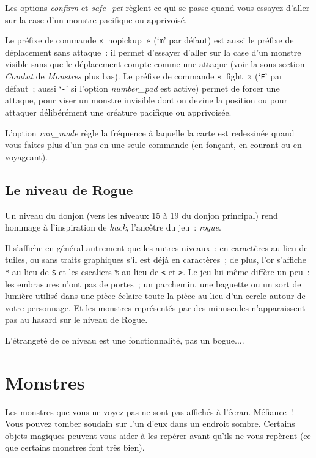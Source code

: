 \documentclass[titlepage]{article}
\begin{document}
Les options
\textit{confirm}
et
\textit{safe\_pet}
règlent ce qui se passe quand vous essayez d'aller sur la case d'un
monstre pacifique ou apprivoisé.


Le préfixe de commande «~nopickup~» (`\texttt{m}' par défaut)
est aussi le préfixe de déplacement sans attaque~: il permet d'essayer
d'aller sur la case d'un monstre visible sans que le déplacement compte
comme une attaque (voir la sous-section \textit{Combat} de \textit{Monstres} plus
bas).
Le préfixe de commande «~fight~» (`\texttt{F}' par défaut~;
aussi `\texttt{-}' si l'option
\textit{number\_pad}
est active) permet de forcer une attaque, pour viser un monstre invisible
dont on devine la position ou pour attaquer délibérément une créature
pacifique ou apprivoisée.


L'option
\textit{run\_mode}
règle la fréquence à laquelle la carte est redessinée quand vous faites
plus d'un pas en une seule commande (en fonçant, en courant ou en
voyageant).

\subsection{Le niveau de Rogue}



Un niveau du donjon (vers les niveaux 15 à 19 du donjon principal) rend
hommage à l'inspiration de \textit{hack}, l'ancêtre du jeu~: \textit{rogue}.


Il s'affiche en général autrement que les autres niveaux~: en caractères
au lieu de tuiles, ou sans traits graphiques s'il est déjà en
caractères~; de plus, l'or s'affiche \texttt{*} au lieu de \texttt{\$} et les
escaliers \texttt{\%} au lieu de \texttt{\textless{}} et \texttt{\textgreater{}}.
Le jeu lui-même diffère un peu~: les embrasures n'ont pas de portes~; un
parchemin, une baguette ou un sort de lumière utilisé dans une pièce
éclaire toute la pièce au lieu d'un cercle autour de votre personnage.
Et les monstres représentés par des minuscules n'apparaissent pas au
hasard sur le niveau de Rogue.


L'étrangeté de ce niveau est une fonctionnalité, pas un bogue....

\section{Monstres}



Les monstres que vous ne voyez pas ne sont pas affichés à l'écran.
Méfiance~!
Vous pouvez tomber soudain sur l'un d'eux dans un endroit sombre.
Certains objets magiques peuvent vous aider à les repérer avant qu'ils ne
vous repèrent (ce que certains monstres font très bien).
\end{document}
